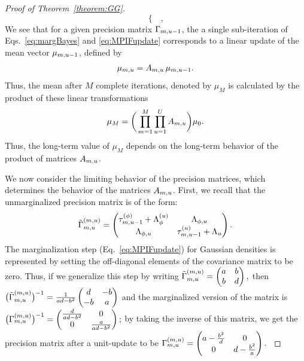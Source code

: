 \documentclass[12pt]{article}\usepackage[]{graphicx}\usepackage[]{xcolor}
\begin{document}
\begin{appendices}
\begin{proof}[Proof of Theorem~\ref{theorem:GG}]
\begin{equation*}
\begin{cases}
\end{cases},
\end{equation*}
We see that for a given precision matrix $\Gamma_{m, u-1}$, the a single sub-iteration of Eqs.~\ref{eq:margBayes} and \ref{eq:MPIFupdate} corresponds to a linear update of the mean vector $\mu_{m, u-1}$, defined by
\begin{align*}
  \mu_{m, u} = A_{m, u} \, \mu_{m, u-1}.
\end{align*}
Thus, the mean after $M$ complete iterations, denoted by $\mu_{M}$ is calculated by the product of these linear transformations
\begin{align*}
  \mu_M = \bigg(\prod_{m = 1}^M\prod_{u = 1}^U A_{m, u}\bigg)\mu_0.
\end{align*}
Thus, the long-term value of $\mu_M$ depends on the long-term behavior of the product of matrices $A_{m, u}$.

We now consider the limiting behavior of the precision matrices, which determines the behavior of the matrices $A_{m, u}$.
First, we recall that the unmarginalized precision matrix is of the form:
\begin{align*}
  {\tilde{\Gamma}}^{(m, u)}_{m, u} = \begin{pmatrix}
  \tau^{(\phi)}_{m, u-1} + \Lambda^{(u)}_{\phi} & \Lambda_{\phi, u} \\
  \Lambda_{\phi, u} & \tau^{(u)}_{m, u-1} + \Lambda_{u}\end{pmatrix}.
\end{align*}
The marginalization step (Eq.~\ref{eq:MPIFupdate}) for Gaussian densities is represented by setting the off-diagonal elements of the covariance matrix to be zero.
Thus, if we generalize this step by writing
\begingroup
\renewcommand{\arraystretch}{0.7}
$
{\tilde{\Gamma}}^{(m, u)}_{m, u} = \begin{pmatrix}a & b \\ b & d \end{pmatrix},
$
\endgroup then
\begingroup
\renewcommand{\arraystretch}{0.7}
$
\big({\tilde{\Gamma}}^{(m, u)}_{m, u}\big)^{-1} = \frac{1}{ad - b^2}\begin{pmatrix}d & -b \\ -b & a\end{pmatrix}
$
\endgroup
and the marginalized version of the matrix is
\begingroup
\renewcommand{\arraystretch}{0.7}
$
\big(\Gamma^{(m, u)}_{m, u}\big)^{-1} =
    \begin{pmatrix} \frac{d}{ad-b^2} & 0 \\ 0 & \frac{a}{ad-b^2}\end{pmatrix};
$
\endgroup
by taking the inverse of this matrix, we get the precision matrix after a unit-update to be
\begingroup
\renewcommand{\arraystretch}{0.7}
$
   \Gamma^{(m, u)}_{m, u} = \begin{pmatrix} a - \frac{b^2}{d} & 0 \\ 0 & d-\frac{b^2}{a}\end{pmatrix}.
$
\endgroup


\end{proof}
\end{appendices}
\end{document}
